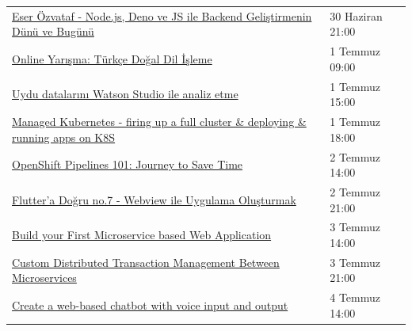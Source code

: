 \documentclass[11pt]{article}
\begin{document}
\begin{longtable}{|p{9.5cm}|l|}
\href{https://kommunity.com/acmhacettepe/events/nodejs-deno-ve-js-ile-backend-gelistirmenin-dunu-ve-bugunu-eser-ozvataf-5ef2730a}{Eser Özvataf - Node.js, Deno ve JS ile Backend Geliştirmenin Dünü ve Bugünü} & 30 Haziran 21:00\\
\href{https://kommunity.com/tracikkaynak/events/online-yarisma-turkce-dogal-dil-isleme-4e93a5ba}{Online Yarışma: Türkçe Doğal Dil İşleme} & 1 Temmuz 09:00\\
\href{https://www.meetup.com/tr-TR/IBMDeveloperTR/events/271308690/}{Uydu datalarını Watson Studio ile analiz etme} & 1 Temmuz 15:00\\
\href{https://www.meetup.com/tr-TR/Oracle-Developer-Meetup-Istanbul/events/271414254/}{Managed Kubernetes - firing up a full cluster \& deploying \& running apps on K8S} & 1 Temmuz 18:00\\
\href{https://www.meetup.com/tr-TR/IBMDeveloperTR/events/271471757/}{OpenShift Pipelines 101: Journey to Save Time} & 2 Temmuz 14:00\\
\href{https://kommunity.com/mobilerdev/events/fluttera-dogru-7-webview-ile-uygulama-olusturmak-cb0ebe4e}{Flutter'a Doğru no.7 - Webview ile Uygulama Oluşturmak} & 2 Temmuz 21:00\\
\href{https://www.meetup.com/tr-TR/IBMDeveloperTR/events/271471860/}{Build your First Microservice based Web Application} & 3 Temmuz 14:00\\
\href{https://kommunity.com/devnot-yazilimci-bulusmalari/events/custom-distributed-transaction-management-between-microservices-850b0f3c}{Custom Distributed Transaction Management Between Microservices} & 3 Temmuz 21:00\\
\href{https://www.meetup.com/tr-TR/IBMDeveloperTR/events/271471941/}{Create a web-based chatbot with voice input and output} & 4 Temmuz 14:00\\
\hline
\end{longtable}
\end{document}
